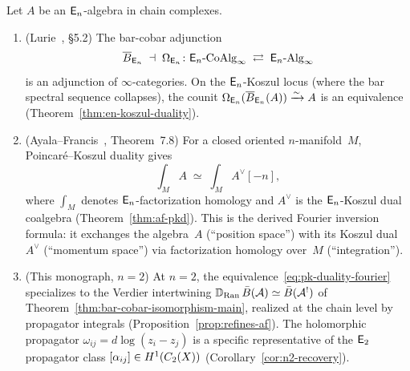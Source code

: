 \begin{theorem}
\label{thm:derived-fourier}
Let $A$ be an $\mathsf{E}_n$-algebra in chain complexes.
\begin{enumerate}[label=\textup{(\roman*)}]
\item \textup{(Lurie~\cite{HA}, \S5.2)}\quad
  The bar-cobar adjunction
  \[
  \overline{B}_{\mathsf{E}_n} \;\dashv\; \Omega_{\mathsf{E}_n}
  \colon
  \mathsf{E}_n\text{-}\mathrm{CoAlg}_\infty
  \;\rightleftarrows\;
  \mathsf{E}_n\text{-}\mathrm{Alg}_\infty
  \]
  is an adjunction of\/ $\infty$-categories.  On the
  $\mathsf{E}_n$-Koszul locus (where the bar spectral sequence
  collapses), the counit
  $\Omega_{\mathsf{E}_n}(\overline{B}_{\mathsf{E}_n}(A)) \xrightarrow{\sim} A$
  is an equivalence
  \textup{(}Theorem~\textup{\ref{thm:en-koszul-duality})}.

\item \textup{(Ayala--Francis~\cite{AF15}, Theorem~7.8)}\quad
  For a closed oriented $n$-manifold~$M$,
  Poincar\'e--Koszul duality gives
  \begin{equation}\label{eq:pk-duality-fourier}
  \int_M A
  \;\simeq\;
  \int_M A^{\vee}[-n],
  \end{equation}
  where $\int_M$ denotes $\mathsf{E}_n$-factorization homology and
  $A^\vee$ is the $\mathsf{E}_n$-Koszul dual coalgebra
  \textup{(}Theorem~\textup{\ref{thm:af-pkd})}.  This is the
  derived Fourier inversion formula: it exchanges the algebra~$A$
  (``position space'') with its Koszul dual~$A^\vee$ (``momentum
  space'') via factorization homology over~$M$ (``integration'').

\item \textup{(This monograph, $n = 2$)}\quad
  At $n = 2$, the equivalence~\eqref{eq:pk-duality-fourier}
  specializes to the Verdier intertwining
  $\mathbb{D}_{\mathrm{Ran}}\, \bar{B}(\mathcal{A}) \simeq \bar{B}(\mathcal{A}^!)$
  of Theorem~\textup{\ref{thm:bar-cobar-isomorphism-main}},
  realized at the chain level by propagator integrals
  \textup{(}Proposition~\textup{\ref{prop:refines-af})}.
  The holomorphic propagator $\omega_{ij} = d\log(z_i - z_j)$
  is a specific representative of the $\mathsf{E}_2$ propagator class
  $[\alpha_{ij}] \in H^1(C_2(X))$
  \textup{(}Corollary~\textup{\ref{cor:n2-recovery})}.
\end{enumerate}
\end{theorem}

